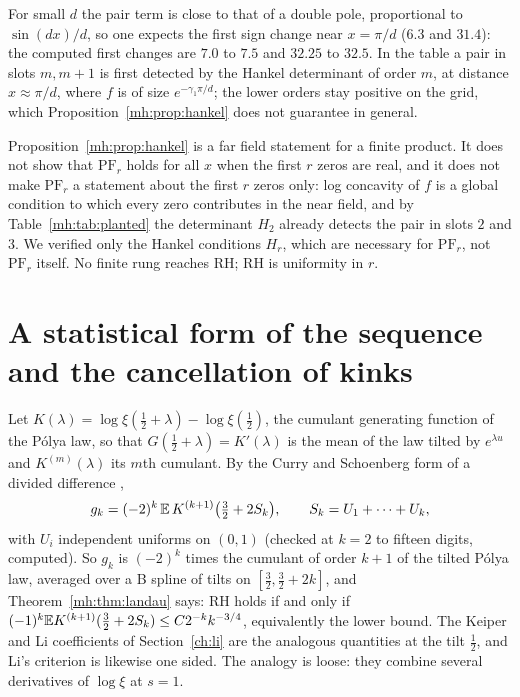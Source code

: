 For small $d$ the pair term is close to that of a double pole, proportional to $\sin(dx)/d$, so one expects the first sign change near $x=\pi/d$ ($6.3$ and $31.4$): the computed first changes are $7.0$ to $7.5$ and $32.25$ to $32.5$. In the table a pair in slots $m,m+1$ is first detected by the Hankel determinant of order $m$, at distance $x\approx\pi/d$, where $f$ is of size $e^{-\gamma_1\pi/d}$; the lower orders stay positive on the grid, which Proposition~\ref{mh:prop:hankel} does not guarantee in general.

\begin{remark}\label{mh:rem:ladder}
Proposition~\ref{mh:prop:hankel} is a far field statement for a finite product. It does not show that $\mathrm{PF}_r$ holds for all $x$ when the first $r$ zeros are real, and it does not make $\mathrm{PF}_r$ a statement about the first $r$ zeros only: log concavity of $f$ is a global condition to which every zero contributes in the near field, and by Table~\ref{mh:tab:planted} the determinant $H_2$ already detects the pair in slots $2$ and $3$. We verified only the Hankel conditions $H_r$, which are necessary for $\mathrm{PF}_r$, not $\mathrm{PF}_r$ itself. No finite rung reaches RH; RH is uniformity in $r$.
\end{remark}

\section{A statistical form of the sequence and the cancellation of kinks}\label{mh:sec:cancel}

Let $K(\lambda)=\log\xi(\tfrac12+\lambda)-\log\xi(\tfrac12)$, the cumulant generating function of the P\'olya law, so that $G(\tfrac12+\lambda)=K'(\lambda)$ is the mean of the law tilted by $e^{\lambda u}$ and $K^{(m)}(\lambda)$ its $m$th cumulant. By the Curry and Schoenberg form of a divided difference \cite{CurrySchoenberg66},
\[
g_k=(-2)^k\,\mathbb{E}\,K^{(k+1)}\big(\tfrac32+2S_k\big),\qquad S_k=U_1+\cdots+U_k,
\]
with $U_i$ independent uniforms on $(0,1)$ (checked at $k=2$ to fifteen digits, computed). So $g_k$ is $(-2)^k$ times the cumulant of order $k+1$ of the tilted P\'olya law, averaged over a B spline of tilts on $[\tfrac32,\tfrac32+2k]$, and Theorem~\ref{mh:thm:landau} says: RH holds if and only if $(-1)^k\mathbb{E} K^{(k+1)}(\tfrac32+2S_k)\le C2^{-k}k^{-3/4}$, equivalently the lower bound. The Keiper and Li coefficients of Section~\ref{ch:li} are the analogous quantities at the tilt $\frac12$, and Li's criterion \cite{Li97} is likewise one sided. The analogy is loose: they combine several derivatives of $\log\xi$ at $s=1$.

